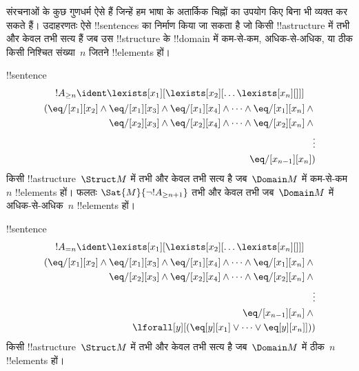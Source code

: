 \documentclass[../../../include/open-logic-section]{subfiles}
\begin{document}


\begin{explain}
संरचनाओं के कुछ गुणधर्म ऐसे हैं जिन्हें हम भाषा के अतार्किक चिह्नों का उपयोग
किए बिना भी व्यक्त कर सकते हैं। उदाहरणतः ऐसे !!{sentence}s का निर्माण किया जा
सकता है जो किसी !!a{structure} में तभी और केवल तभी सत्य हैं जब उस !!{structure} के !!{domain}
में कम-से-कम, अधिक-से-अधिक, या ठीक किसी निश्चित संख्या~$n$ जितने
!!{element}s हों।
\end{explain}

\begin{prop}
!!{sentence}
\begin{multline*}
  {}!A_{\ge n} \ident \lexists[x_1][\lexists[x_2][\dots\lexists[x_n][{}]]]\\
  \begin{aligned}
  (\eq/[x_1][x_2] \land {}
  \eq/[x_1][x_3] \land \eq/[x_1][x_4] \land \dots \land \eq/[x_1][x_n] \land {}\\
\eq/[x_2][x_3] \land \eq/[x_2][x_4] \land \dots \land {} \eq/[x_2][x_n] \land {} \\
\vdots\\
\eq/[x_{n-1}][x_n])
\end{aligned}
\end{multline*}
किसी !!a{structure}~$\Struct M$ में तभी और केवल तभी सत्य है जब~$\Domain M$
में कम-से-कम~$n$ !!{element}s हों। फलतः $\Sat{M}{\lnot !A_{\ge n+1}}$ तभी
और केवल तभी जब~$\Domain M$ में अधिक-से-अधिक~$n$ !!{element}s हों।

\end{prop}

\begin{prop}
!!{sentence}
\begin{multline*}
{}!A_{= n} \ident \lexists[x_1][\lexists[x_2][\dots\lexists[x_n][{}]]] \\
\begin{aligned}
  (\eq/[x_1][x_2] \land {}
  \eq/[x_1][x_3] \land \eq/[x_1][x_4] \land \dots \land \eq/[x_1][x_n] \land {}\\
\eq/[x_2][x_3] \land \eq/[x_2][x_4] \land \dots \land {} \eq/[x_2][x_n] \land {} \\
\vdots\\
\eq/[x_{n-1}][x_n] \land {} \\
\lforall[y][(\eq[y][x_1] \lor \dots \lor \eq[y][x_n]]))
\end{aligned}
\end{multline*}
किसी !!a{structure}~$\Struct M$ में तभी और केवल तभी सत्य है जब~$\Domain M$
में ठीक~$n$ !!{element}s हों।
\end{prop}
\end{document}
